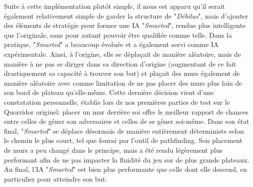 \documentclass[a4paper, 12pt]{article}
\begin{document}
Suite à cette implémentation plutôt simple, il nous est apparu qu'il serait également relativement simple de garder la structure de "\textit{Débilus}", mais d'ajouter des éléments de stratégie pour former une IA "\textit{Smarted}", rendue plus intelligente que l'originale, sans pour autant pouvoir être qualifiée comme telle.
Dans la pratique, "\textit{Smarted}" a beaucoup évoluée et a également servi comme IA expérimentale. Ainsi, à l'origine, elle se déplaçait de manière aléatoire, mais de manière à ne pas se diriger dans sa direction d'origine (augmentant de ce fait drastiquement sa capacité à trouver son but) et plaçait des murs également de manière aléatoire avec comme limitation de ne pas placer des murs plus loin de son bord de plateau qu'elle-même.
Cette dernière décision vient d'une constatation personnelle, établie lors de nos premières parties de test sur le Quorridor originel: placer un mur derrière soi offre le meilleur rapport de chances entre celles de gêner son adversaires et celles de se gêner soi-même.
Dans son état final, "\textit{Smarted}" se déplace désormais de manière entièrement déterministe selon le chemin le plus court, tel que fourni par l'outil de pathfinding. Son placement de murs a peu changé dans le principe, mais a été rendu légèrement plus performant afin de ne pas impacter la fluidité du jeu sur de plus grands plateaux. Au final, l'IA "\textit{Smarted}" est bien plus performante que celle dont elle descend, en particulier pour atteindre son but.
\end{document}

